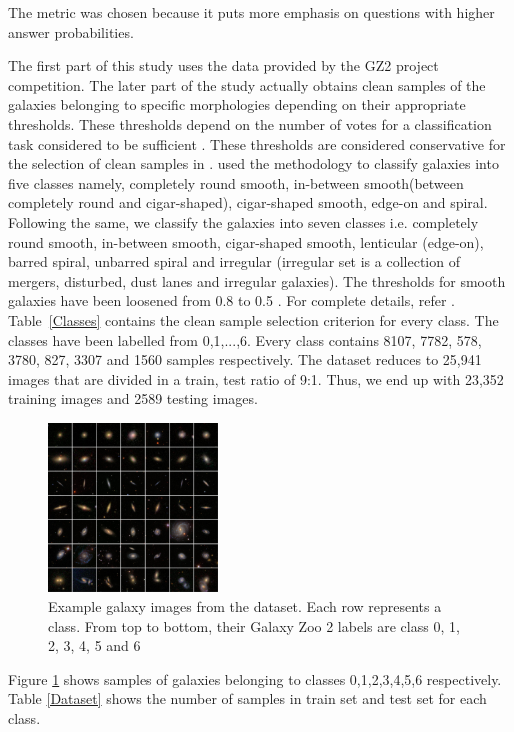 \documentclass[fleqn,usenatbib]{mnras}
\begin{document}
The metric was chosen because it puts more emphasis on questions with higher answer probabilities.

\begin{center}
    
\end{center}
\hspace{0.25 in}The first part of this study uses the data provided by the GZ2 project competition. The later part of the study actually obtains clean samples of the galaxies belonging to specific morphologies depending on their appropriate thresholds. These thresholds depend on the number of votes for a classification task considered to be sufficient \citep{dai2018galaxy}. These thresholds are considered conservative for the selection of clean samples in \citet{Willett_2013}. \citet{dai2018galaxy} used the methodology to classify galaxies into five classes namely, completely round smooth, in-between smooth(between completely round and cigar-shaped), cigar-shaped smooth, edge-on and spiral. Following the same, we classify the galaxies into seven classes i.e. completely round smooth, in-between smooth, cigar-shaped smooth, lenticular (edge-on), barred spiral, unbarred spiral and irregular (irregular set is a collection of mergers, disturbed, dust lanes and irregular galaxies). The thresholds for smooth galaxies have been loosened from 0.8 to 0.5 \citep{dai2018galaxy}. For complete details, refer \citet{Willett_2013}. Table~\ref{Classes} contains the clean sample selection criterion for every class. The classes have been labelled from 0,1,...,6. Every class contains 8107, 7782, 578, 3780, 827, 3307 and 1560 samples respectively. The dataset reduces to 25,941 images that are divided in a train, test ratio of 9:1. Thus, we end up with 23,352 training images and 2589 testing images.
\begin{center}
    
\end{center}
\begin{figure}
    \centering
    \includegraphics[width=0.4\textwidth]{images/samples.jpg}
    \caption{Example galaxy images from the dataset. Each row represents a class. From top to bottom, their Galaxy Zoo 2 labels are class 0, 1, 2, 3, 4, 5 and 6}
    \label{sample_images}
\end{figure}
\hspace{0.25 in}Figure \ref{sample_images} shows samples of galaxies belonging to classes 0,1,2,3,4,5,6 respectively. Table \ref{Dataset} shows the number of samples in train set and test set for each class.
\end{document}
